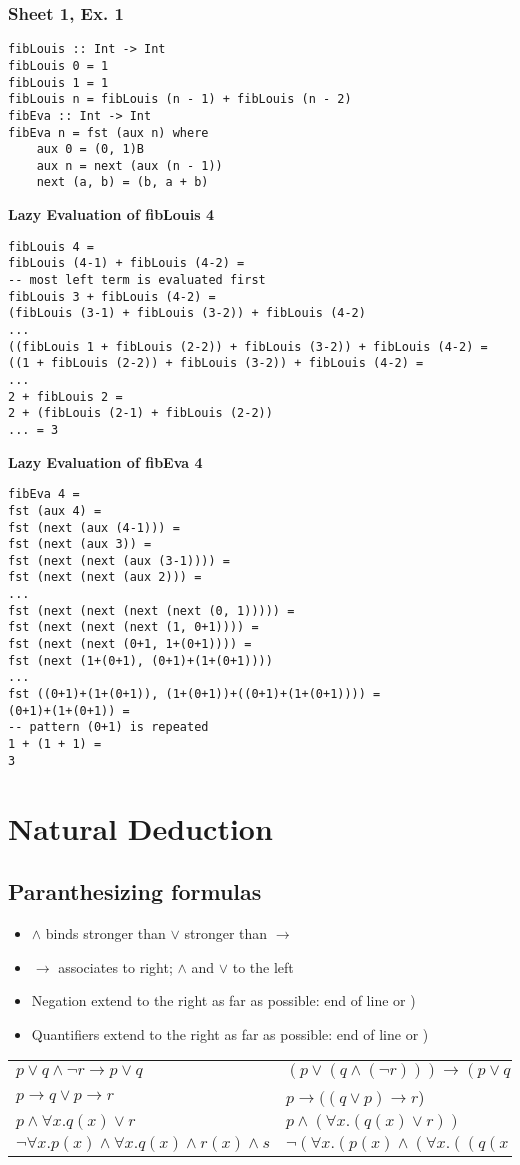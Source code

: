 \documentclass[12pt]{article}
\def\li{\rightarrow}
\def\fax{\forall x.}
\begin{document}
\subsubsection{Sheet 1, Ex. 1}
\begin{verbatim}
fibLouis :: Int -> Int
fibLouis 0 = 1
fibLouis 1 = 1
fibLouis n = fibLouis (n - 1) + fibLouis (n - 2)
fibEva :: Int -> Int
fibEva n = fst (aux n) where 
    aux 0 = (0, 1)B
    aux n = next (aux (n - 1))
    next (a, b) = (b, a + b)
\end{verbatim}
\textbf{Lazy Evaluation of fibLouis 4}
\begin{verbatim}
fibLouis 4 =
fibLouis (4-1) + fibLouis (4-2) =
-- most left term is evaluated first
fibLouis 3 + fibLouis (4-2) =
(fibLouis (3-1) + fibLouis (3-2)) + fibLouis (4-2) 
...
((fibLouis 1 + fibLouis (2-2)) + fibLouis (3-2)) + fibLouis (4-2) =
((1 + fibLouis (2-2)) + fibLouis (3-2)) + fibLouis (4-2) =
...
2 + fibLouis 2 =
2 + (fibLouis (2-1) + fibLouis (2-2))
... = 3
\end{verbatim}
\textbf{Lazy Evaluation of fibEva 4}
\begin{verbatim}
fibEva 4 =
fst (aux 4) =
fst (next (aux (4-1))) =
fst (next (aux 3)) =
fst (next (next (aux (3-1)))) =
fst (next (next (aux 2))) =
...
fst (next (next (next (next (0, 1))))) =
fst (next (next (next (1, 0+1)))) =
fst (next (next (0+1, 1+(0+1)))) =
fst (next (1+(0+1), (0+1)+(1+(0+1)))) 
...
fst ((0+1)+(1+(0+1)), (1+(0+1))+((0+1)+(1+(0+1)))) =
(0+1)+(1+(0+1)) =
-- pattern (0+1) is repeated
1 + (1 + 1) =
3
\end{verbatim}

\section{Natural Deduction}
\subsection{Paranthesizing formulas} 
\begin{itemize}
    \item $\land$ binds stronger than $\lor$ stronger than $\li$
    \item $\li$ associates to right; $\land$ and $\lor$ to the left
    \item Negation extend to the right as far as possible: end of line or )
    \item Quantifiers extend to the right as far as possible: end of line or )
\end{itemize}
\begin{tabular}{l l}
    $p \lor q \land \lnot r \li p \lor q$ & $(p \lor (q \land (\lnot r))) \li (p \lor q)$ \\
    $p \li q \lor p \li r$ & $p \li ((q \lor p) \li r$) \\
    $p \land \fax q(x) \lor r$ & $p \land (\fax (q(x) \lor r))$ \\
    $\lnot \fax p(x) \land \fax q(x) \land r(x) \land s$ &  $\lnot( \fax (p(x) \land (\fax ((q(x) \land r(x)) \land s))))$
\end{tabular} 
\end{document}
